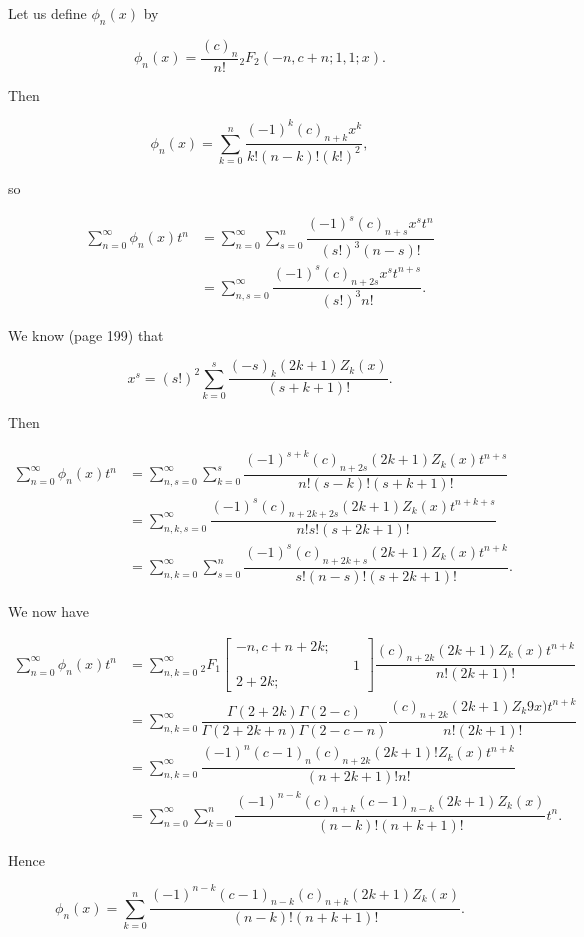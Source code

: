\begin{solution}
Let us define $\phi_n(x)$ by

$$\phi_n(x) = \dfrac{(c)_n}{n!} {}_2F_2 (-n,c+n;1,1;x).$$

Then

$$\phi_n(x) = \displaystyle\sum_{k=0}^n \dfrac{(-1)^k (c)_{n+k} x^k}{k! (n-k)! (k!)^2},$$

so

$$\begin{array}{ll}
\displaystyle\sum_{n=0}^{\infty} \phi_n(x) t^n &= \displaystyle\sum_{n=0}^{\infty} \displaystyle\sum_{s=0}^n \dfrac{(-1)^s (c)_{n+s} x^s t^n}{(s!)^3 (n-s)!} \\
&= \displaystyle\sum_{n,s=0}^{\infty} \dfrac{(-1)^s (c)_{n+2s} x^s t^{n+s}}{(s!)^3 n!}.
\end{array}$$

We know (page 199) that

$$x^s = (s!)^2 \displaystyle\sum_{k=0}^s \dfrac{(-s)_k (2k+1) Z_k(x)}{(s+k+1)!}.$$

Then

$$\begin{array}{ll}
\displaystyle\sum_{n=0}^{\infty} \phi_n(x) t^n &= \displaystyle\sum_{n,s=0}^{\infty} \displaystyle\sum_{k=0}^s \dfrac{(-1)^{s+k} (c)_{n+2s} (2k+1) Z_k(x) t^{n+s}}{n! (s-k)! (s+k+1)!} \\
&= \displaystyle\sum_{n,k,s=0}^{\infty} \dfrac{(-1)^s (c)_{n+2k+2s}(2k+1)Z_k(x) t^{n+k+s}}{n! s! (s+2k+1)!} \\
&= \displaystyle\sum_{n,k=0}^{\infty} \displaystyle\sum_{s=0}^n \dfrac{(-1)^s (c)_{n+2k+s} (2k+1) Z_k(x) t^{n+k}}{s! (n-s)! (s+2k+1)!}.
\end{array}$$

We now have

$$\begin{array}{ll}
\displaystyle\sum_{n=0}^{\infty} \phi_n(x) t^n &= \displaystyle\sum_{n,k=0}^{\infty} {}_2F_1 \left[ \begin{array}{rlr} 
-n, c+n+2k; & & \\
& & 1 \\
2+2k; & &
\end{array} \right] \dfrac{(c)_{n+2k} (2k+1) Z_k(x) t^{n+k}}{n! (2k+1)!} \\
&= \displaystyle\sum_{n,k=0}^{\infty} \dfrac{\Gamma(2+2k) \Gamma(2-c)}{\Gamma(2+2k+n) \Gamma(2-c-n)} \dfrac{(c)_{n+2k} (2k+1) Z_k9x) t^{n+k}}{n! (2k+1)!} \\
&= \displaystyle\sum_{n,k=0}^{\infty} \dfrac{(-1)^n (c-1)_n (c)_{n+2k} (2k+1)! Z_k(x) t^{n+k}}{(n+2k+1)! n!} \\
&= \displaystyle\sum_{n=0}^{\infty} \displaystyle\sum_{k=0}^n \dfrac{(-1)^{n-k} (c)_{n+k} (c-1)_{n-k} (2k+1) Z_k(x)}{(n-k)! (n+k+1)!} t^n.
\end{array}$$

Hence

$$\phi_n(x) = \displaystyle\sum_{k=0}^n \dfrac{(-1)^{n-k} (c-1)_{n-k} (c)_{n+k} (2k+1) Z_k(x)}{(n-k)! (n+k+1)!}.$$
\end{solution}
